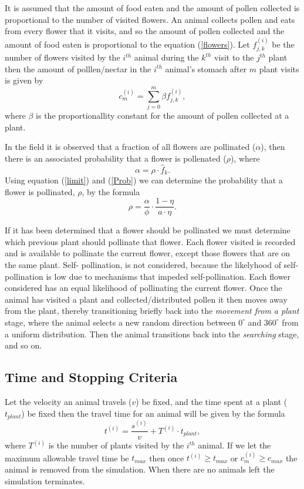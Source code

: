 \documentclass[preprint,12pt]{elsarticle}
\numberwithin{equation}{subsection}
\begin{document}
It is assumed that the amount of food eaten and the amount of pollen collected
is proportional to the number of visited flowers. An animal collects pollen and
eats from every flower that it visits, and so the amount of pollen collected and
the amount of food eaten is proportional to the equation (\ref{flowers}). Let
$f^{\left(i\right)}_{j,k}$ be the number of flowers visited by the $i^{th}$
animal during the $k^{th}$ visit to the $j^{th}$ plant then the amount of
polllen/nectar in the $i^{th}$ animal's stomach after $m$ plant visits is given
by
\[
	c^{\left(i\right)}_m = \sum_{j=0}^{m} \beta f^{\left(i\right)}_{j,k},
\]
where $\beta$ is the proportionallity constant for the amount of pollen
collected at a plant. %

In the field it is observed that a fraction of all flowers are pollinated
($\alpha$), then there is an associated probability that a flower is pollenated
($\rho$), where
\begin{equation} \label{Prob}
	\alpha = \rho \cdot \hat{f}_k.
\end{equation}
Using equation (\ref{limit}) and (\ref{Prob}) we can determine the probability
that a flower is pollinated, $\rho$, by the formula
\[
	\rho = \frac{\alpha}{\phi} \cdot \frac{1 - \eta}{a \cdot \eta}.
\]

If it has been determined that a flower should be pollinated we must determine
which previous plant should pollinate that flower. Each flower visited is
recorded and is available to pollinate the current flower, except those flowers
that are on the same plant. Self- pollination, is not considered, because the
likelyhood of self-pollination is low due to mechanisms that impeded
self-pollination. Each flower considered has an equal likelihood of pollinating
the current flower. Once the animal has visited a plant and
collected/distributed pollen it then moves away from the plant, thereby
transitioning briefly back into the \emph{movement from a plant} stage, where
the animal selects a new random direction between $0^\circ$ and $360^\circ$ from
a uniform distribution. Then the animal transitions back into the
\emph{searching} stage, and so on.

\subsection{Time and Stopping Criteria}
Let the velocity an animal travels ($v$) be fixed, and the time spent at a plant
($t_{plant}$) be fixed then the travel time for an animal will be given by the
formula
\[
	t^{\left(i\right)} = \frac{s^{\left(i\right)}}{v} + T^{\left(i\right)}
\cdot t_{plant},
\]
where $T^{\left(i\right)}$ is the number of plants visited by the $i^{th}$
animal. If we let the maximum allowable travel time be $t_{max}$ then once
$t^{\left(i\right)} \geq t_{max}$ or $c^{\left(i\right)}_m \geq c_{max}$ the
animal is removed from the simulation. When there are no animals left the
simulation terminates.
\end{document}
